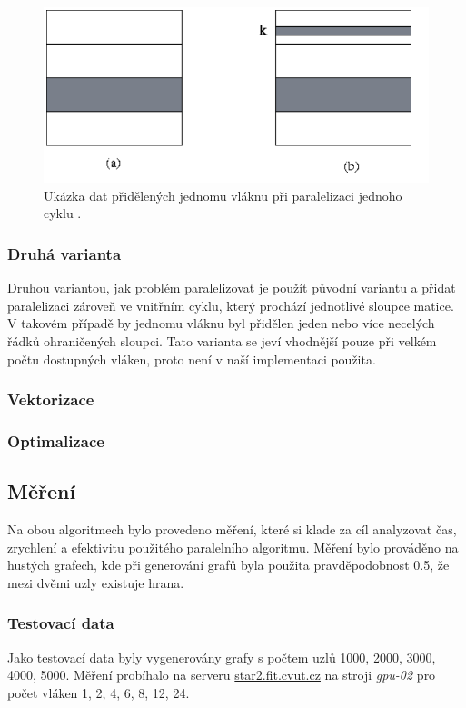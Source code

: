 \begin{figure}
    \centering
    \includegraphics[width=\textwidth]{floyd-openmp}
    \caption{Ukázka dat přidělených jednomu vláknu při paralelizaci jednoho cyklu \cite{w:flo:omp}.}
    \label{f:flo:omp}
\end{figure}


\subsubsection{Druhá varianta}
Druhou variantou, jak problém paralelizovat je použít původní variantu a přidat paralelizaci zároveň ve vnitřním cyklu, který prochází jednotlivé sloupce matice. V takovém případě by jednomu vláknu byl přidělen jeden nebo více necelých řádků ohraničených sloupci. Tato varianta se jeví vhodnější pouze při velkém počtu dostupných vláken, proto není v naší implementaci použita.

\subsubsection{Vektorizace}

\subsubsection{Optimalizace}

\subsection{Měření}
Na obou algoritmech bylo provedeno měření, které si klade za cíl analyzovat čas, zrychlení a efektivitu použitého paralelního algoritmu. Měření bylo prováděno na hustých grafech, kde při generování grafů byla použita pravděpodobnost 0.5, že mezi dvěmi uzly existuje hrana.

\subsubsection{Testovací data}
Jako testovací data byly vygenerovány grafy s počtem uzlů 1000, 2000, 3000, 4000, 5000. Měření probíhalo na serveru \url{star2.fit.cvut.cz} na stroji \textit{gpu-02} pro počet vláken 1, 2, 4, 6, 8, 12, 24.

